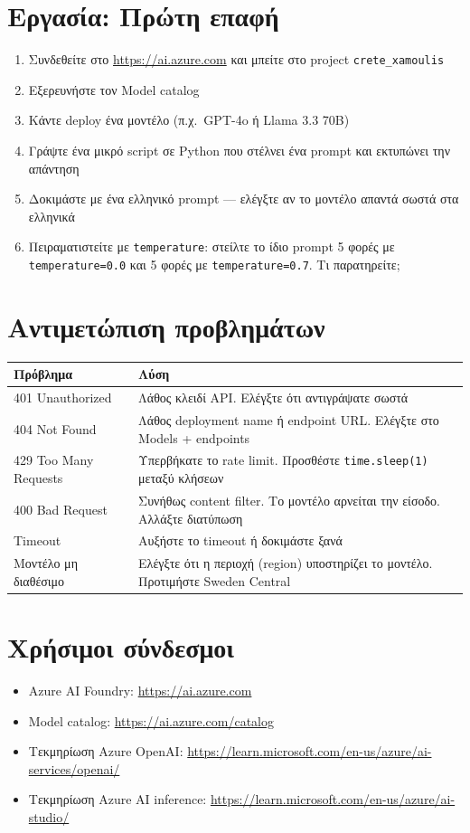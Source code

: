 \documentclass[11pt,a4paper]{article}
\begin{document}
\section{Εργασία: Πρώτη επαφή}

\begin{enumerate}[leftmargin=1.5em]
\item Συνδεθείτε στο \url{https://ai.azure.com} και μπείτε στο project \texttt{crete\_xamoulis}
\item Εξερευνήστε τον Model catalog
\item Κάντε deploy ένα μοντέλο (π.χ.\ GPT-4o ή Llama 3.3 70B)
\item Γράψτε ένα μικρό script σε Python που στέλνει ένα prompt και εκτυπώνει την απάντηση
\item Δοκιμάστε με ένα ελληνικό prompt --- ελέγξτε αν το μοντέλο απαντά σωστά στα ελληνικά
\item Πειραματιστείτε με \texttt{temperature}: στείλτε το ίδιο prompt 5 φορές με \texttt{temperature=0.0} και 5 φορές με \texttt{temperature=0.7}. Τι παρατηρείτε;
\end{enumerate}

\section{Αντιμετώπιση προβλημάτων}

\begin{table}[h!]
\centering\small
\begin{tabularx}{\textwidth}{l X}
\toprule
\textbf{Πρόβλημα} & \textbf{Λύση} \\
\midrule
401 Unauthorized & Λάθος κλειδί API. Ελέγξτε ότι αντιγράψατε σωστά \\
404 Not Found & Λάθος deployment name ή endpoint URL. Ελέγξτε στο Models + endpoints \\
429 Too Many Requests & Υπερβήκατε το rate limit. Προσθέστε \texttt{time.sleep(1)} μεταξύ κλήσεων \\
400 Bad Request & Συνήθως content filter. Το μοντέλο αρνείται την είσοδο. Αλλάξτε διατύπωση \\
Timeout & Αυξήστε το timeout ή δοκιμάστε ξανά \\
Μοντέλο μη διαθέσιμο & Ελέγξτε ότι η περιοχή (region) υποστηρίζει το μοντέλο. Προτιμήστε Sweden Central \\
\bottomrule
\end{tabularx}
\end{table}

\section{Χρήσιμοι σύνδεσμοι}

\begin{itemize}[nosep,leftmargin=1.5em]
\item Azure AI Foundry: \url{https://ai.azure.com}
\item Model catalog: \url{https://ai.azure.com/catalog}
\item Τεκμηρίωση Azure OpenAI: \url{https://learn.microsoft.com/en-us/azure/ai-services/openai/}
\item Τεκμηρίωση Azure AI inference: \url{https://learn.microsoft.com/en-us/azure/ai-studio/}
\end{itemize}
\end{document}
